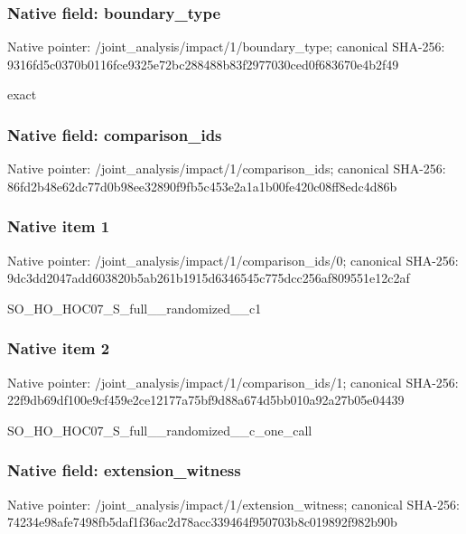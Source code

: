 \documentclass[10pt,a4paper]{article}
\begin{document}
\subsubsection{Native field: boundary\_\allowbreak{}type}
Native pointer: /joint\_\allowbreak{}analysis/impact/1/boundary\_\allowbreak{}type; canonical SHA-256: 9316fd5c0370b0116fce9325e72bc288488b83f2977030ced0f683670e4b2f49

\begingroup\raggedright\sloppy exact\par\endgroup

\subsubsection{Native field: comparison\_\allowbreak{}ids}
Native pointer: /joint\_\allowbreak{}analysis/impact/1/comparison\_\allowbreak{}ids; canonical SHA-256: 86fd2b48e62dc77d0b98ee32890f9fb5c453e2a1a1b00fe420c08ff8edc4d86b

\subsubsection{Native item 1}
Native pointer: /joint\_\allowbreak{}analysis/impact/1/comparison\_\allowbreak{}ids/0; canonical SHA-256: 9dc3dd2047add603820b5ab261b1915d6346545c775dcc256af809551e12c2af

\begingroup\raggedright\sloppy SO\_\allowbreak{}HO\_\allowbreak{}HOC07\_\allowbreak{}S\_\allowbreak{}full\_\allowbreak{}\_\allowbreak{}randomized\_\allowbreak{}\_\allowbreak{}c1\par\endgroup

\subsubsection{Native item 2}
Native pointer: /joint\_\allowbreak{}analysis/impact/1/comparison\_\allowbreak{}ids/1; canonical SHA-256: 22f9db69df100e9cf459e2ce12177a75bf9d88a674d5bb010a92a27b05e04439

\begingroup\raggedright\sloppy SO\_\allowbreak{}HO\_\allowbreak{}HOC07\_\allowbreak{}S\_\allowbreak{}full\_\allowbreak{}\_\allowbreak{}randomized\_\allowbreak{}\_\allowbreak{}c\_\allowbreak{}one\_\allowbreak{}call\par\endgroup

\subsubsection{Native field: extension\_\allowbreak{}witness}
Native pointer: /joint\_\allowbreak{}analysis/impact/1/extension\_\allowbreak{}witness; canonical SHA-256: 74234e98afe7498fb5daf1f36ac2d78acc339464f950703b8c019892f982b90b
\end{document}

